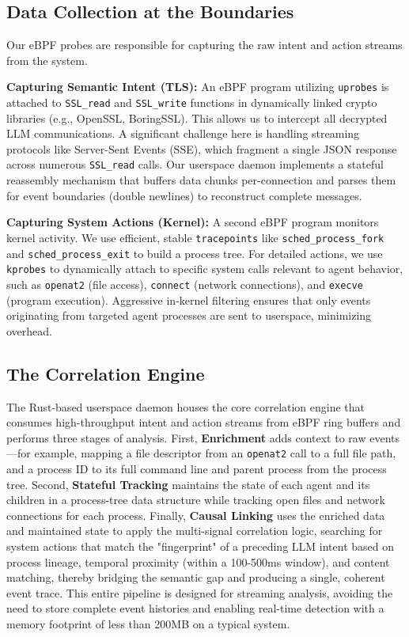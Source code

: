 \subsection{Data Collection at the Boundaries}
Our eBPF probes are responsible for capturing the raw intent and action streams from the system.

\textbf{Capturing Semantic Intent (TLS):} An eBPF program utilizing \texttt{uprobes} is attached to \texttt{SSL\_read} and \texttt{SSL\_write} functions in dynamically linked crypto libraries (e.g., OpenSSL, BoringSSL). This allows us to intercept all decrypted LLM communications. A significant challenge here is handling streaming protocols like Server-Sent Events (SSE), which fragment a single JSON response across numerous \texttt{SSL\_read} calls. Our userspace daemon implements a stateful reassembly mechanism that buffers data chunks per-connection and parses them for event boundaries (double newlines) to reconstruct complete messages.

\textbf{Capturing System Actions (Kernel):} A second eBPF program monitors kernel activity. We use efficient, stable \texttt{tracepoints} like \texttt{sched\_process\_fork} and \texttt{sched\_process\_exit} to build a process tree. For detailed actions, we use \texttt{kprobes} to dynamically attach to specific system calls relevant to agent behavior, such as \texttt{openat2} (file access), \texttt{connect} (network connections), and \texttt{execve} (program execution). Aggressive in-kernel filtering ensures that only events originating from targeted agent processes are sent to userspace, minimizing overhead.

\subsection{The Correlation Engine}
The Rust-based userspace daemon houses the core correlation engine that consumes high-throughput intent and action streams from eBPF ring buffers and performs three stages of analysis. First, \textbf{Enrichment} adds context to raw events—for example, mapping a file descriptor from an \texttt{openat2} call to a full file path, and a process ID to its full command line and parent process from the process tree. Second, \textbf{Stateful Tracking} maintains the state of each agent and its children in a process-tree data structure while tracking open files and network connections for each process. Finally, \textbf{Causal Linking} uses the enriched data and maintained state to apply the multi-signal correlation logic, searching for system actions that match the "fingerprint" of a preceding LLM intent based on process lineage, temporal proximity (within a 100-500ms window), and content matching, thereby bridging the semantic gap and producing a single, coherent event trace. This entire pipeline is designed for streaming analysis, avoiding the need to store complete event histories and enabling real-time detection with a memory footprint of less than 200MB on a typical system. 